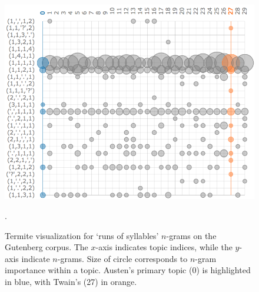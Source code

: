 \documentclass[14pt]{article} %
\theoremstyle{plain}
\theoremstyle{definition}
\theoremstyle{remark}
\begin{document}
\begin{figure}
\centering
\includegraphics[width=0.5\linewidth]{termite.png}
\caption{Termite visualization for `runs of syllables' $n$-grams on the Gutenberg corpus. The $x$-axis indicates topic indices, while the $y$-axis indicate $n$-grams. Size of circle corresponds to $n$-gram importance within a topic. Austen's primary topic (0) is highlighted in blue, with Twain's (27) in orange.}
\label{fig:termite}.
\end{figure}
\end{document}
